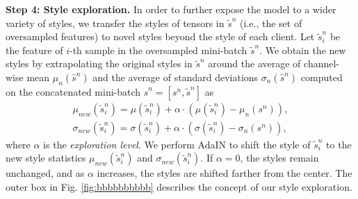 \documentclass{article}
\theoremstyle{plain}
\theoremstyle{definition}
\theoremstyle{remark}
\begin{document}
\textbf{Step 4: Style exploration.} In order to further  expose the model to a wider variety of styles, we transfer the styles of tensors in  $\tilde{s}^n$ (i.e., the set of oversampled features) to novel styles beyond the style of each client.  Let $\tilde{s}_i^n$ be the feature of $i$-th sample in the oversampled mini-batch $\tilde{s}^n$. We obtain the new styles by extrapolating the original styles in $\tilde{s}^n$ around the average of channel-wise mean $\mu_n(\hat{s}^n)$  and the average of standard deviations $\sigma_n(\hat{s}^n)$ computed on the   concatenated mini-batch $\hat{s}^n =  [s^n, \tilde{s}^n ]$ as 
\begin{align}\label{alpha12} 
\mu_{new}(\tilde{s}_i^n)= \mu(\tilde{s}_i^n) + \alpha \cdot (\mu(\tilde{s}_i^n) - \mu_n( s^n)),\\  \sigma_{new}(\tilde{s}_i^n)= \sigma(\tilde{s}_i^n) + \alpha \cdot (\sigma(\tilde{s}_i^n) - \sigma_n(s^n)),
\end{align}
where $\alpha$ is the \textit{exploration level}.  We perform AdaIN to shift the style   of $\tilde{s}_i^n$ to the  new style statistics $\mu_{new}(\tilde{s}_i^n)$ and  $\sigma_{new}(\tilde{s}_i^n)$. If $\alpha=0$, the styles remain unchanged, and as   $\alpha$ increases, the styles are shifted farther from the center.    The outer box in Fig. \ref{fig:bbbbbbbbbb}      describes the concept of our style exploration.  



 
 
\end{document}
